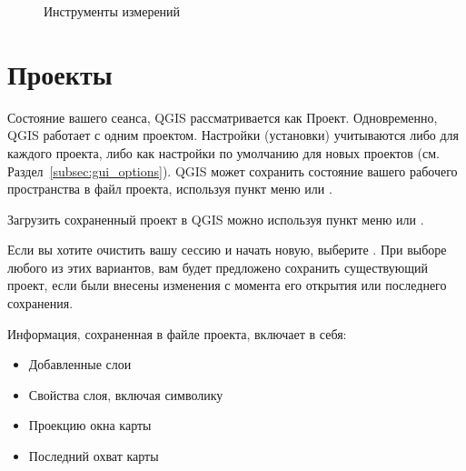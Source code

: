 \begin{figure}[ht]
\centering
     \hspace{0.33cm}
     \hspace{0.33cm}
   \caption{Инструменты измерений \nixcaption} \label{fig:measure}
\end{figure}


\section{Проекты}\label{sec:projects}

Состояние вашего сеанса, QGIS рассматривается как Проект. Одновременно,
QGIS работает с одним проектом. Настройки (установки) учитываются либо
для каждого проекта, либо как настройки по умолчанию для новых проектов
(см. Раздел~\ref{subsec:gui_options}). QGIS может сохранить состояние
вашего рабочего пространства в файл проекта, используя пункт меню
 \arrow {}
или  \arrow
{}.

Загрузить сохраненный проект в QGIS можно используя пункт меню
 \arrow {}
или  \arrow {}.

Если вы хотите очистить вашу сессию и начать новую, выберите 
\arrow {}. При выборе любого
из этих вариантов, вам будет предложено сохранить существующий проект, если
были внесены изменения с момента его открытия или последнего сохранения.

Информация, сохраненная в файле проекта, включает в себя:

\begin{itemize}
\item Добавленные слои
\item Свойства слоя, включая символику
\item Проекцию окна карты
\item Последний охват карты
\end{itemize}

